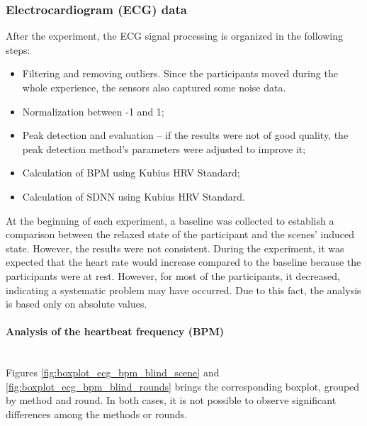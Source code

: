 \subsubsection{Electrocardiogram (ECG) data}
\label{subsubsec:results_ecg_1}

After the experiment, the ECG signal processing is organized in the following steps: 

\begin{itemize}
    \item Filtering and removing outliers. Since the participants moved during the whole experience, the sensors also captured some noise data.
    \item Normalization between -1 and 1;
    \item Peak detection and evaluation – if the results were not of good quality, the peak detection method's parameters were adjusted to improve it; 
    \item Calculation of BPM using Kubius HRV Standard;
    \item Calculation of SDNN using Kubius HRV Standard.
\end{itemize}

At the beginning of each experiment, a baseline was collected to establish a comparison between the relaxed state of the participant and the scenes' induced state. However, the results were not consistent.  During the experiment, it was expected that the heart rate would increase compared to the baseline because the participants were at rest. However, for most of the participants, it decreased, indicating a systematic problem may have occurred. Due to this fact, the analysis is based only on absolute values.

\paragraph*{Analysis of the heartbeat frequency (BPM)}\mbox{}\\

Figures \ref{fig:boxplot_ecg_bpm_blind_scene} and \ref{fig:boxplot_ecg_bpm_blind_rounds} brings the corresponding boxplot, grouped by method and round. In both cases, it is not possible to observe significant differences among the methods or rounds.

